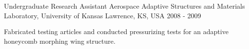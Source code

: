 \begin{cventries}
  \cvpositionentry
    {Undergraduate Research Assistant} %
    {Aerospace Adaptive Structures and Materials Laboratory, University of Kansas} %
    {Lawrence, KS, USA} %
    {2008 - 2009} %
    {
      \begin{cvleftitems} %
        \item {Fabricated testing articles and conducted pressurizing tests for an adaptive honeycomb morphing wing structure.}
      \end{cvleftitems}
    }


\end{cventries}
